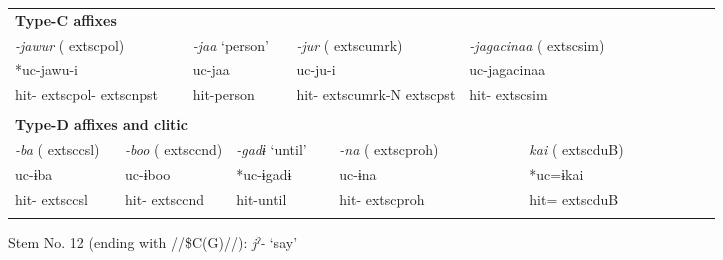 \begin{tabularx}{\textwidth}{XXm{}XXXXXXXXXXXXXXXXXXXX}
\multicolumn{23}{X}{{\bfseries Type-C affixes}}\\
\multicolumn{4}{X}{{ \textit{{}-jawur} (	extsc{pol})}} & \multicolumn{3}{X}{{ \textit{{}-jaa} ‘person’}} & \multicolumn{5}{X}{{ \textit{{}-jur} (	extsc{umrk})}} & \multicolumn{4}{X}{{ \textit{{}-jagacinaa} (	extsc{sim})}} & \multicolumn{7}{X}{}\\
\multicolumn{4}{X}{{ *uc-jawu-i}} & \multicolumn{3}{X}{uc-jaa} & \multicolumn{5}{X}{uc-ju-i} & \multicolumn{4}{X}{{ uc-jagacinaa}} & \multicolumn{7}{X}{}\\
\multicolumn{4}{X}{hit-	extsc{pol}-	extsc{npst}} & \multicolumn{3}{X}{hit-person} & \multicolumn{5}{X}{hit-	extsc{umrk}-N	extsc{pst}} & \multicolumn{4}{X}{hit-	extsc{sim}} & \multicolumn{7}{X}{}\\
\multicolumn{23}{X}{}\\
\multicolumn{23}{X}{{\bfseries Type-D affixes and clitic}}\\
{ \textit{{}-ba} (	extsc{csl})} & \multicolumn{4}{X}{{ \textit{{}-boo} (	extsc{cnd})}} & \multicolumn{4}{X}{{ \textit{{}-gadɨ} ‘until’}} & \multicolumn{4}{X}{{ \textit{{}-na} (	extsc{proh})}} & \multicolumn{4}{X}{{ \textit{kai} (	extsc{du}B)}} & \multicolumn{6}{X}{}\\
{ uc-ɨba} & \multicolumn{4}{X}{{ uc-ɨboo}} & \multicolumn{4}{X}{{ *uc-ɨgadɨ}} & \multicolumn{4}{X}{{ uc-ɨna}} & \multicolumn{4}{X}{{ *uc=ɨkai}} & \multicolumn{6}{X}{}\\
hit-	extsc{csl} & \multicolumn{4}{X}{hit-	extsc{cnd}} & \multicolumn{4}{X}{hit-until} & \multicolumn{4}{X}{hit-	extsc{proh}} & \multicolumn{4}{X}{hit=	extsc{du}B} & \multicolumn{6}{X}{}\\
\lspbottomrule
\end{tabularx}
Stem No. 12 (ending with //\$C(G)//): \textit{jˀ-} ‘say’

\tablefirsthead{}

